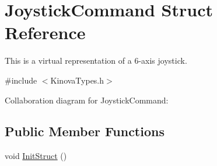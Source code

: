 \hypertarget{struct_joystick_command}{}\section{Joystick\+Command Struct Reference}
\label{struct_joystick_command}


This is a virtual representation of a 6-\/axis joystick.  




{\ttfamily \#include $<$Kinova\+Types.\+h$>$}



Collaboration diagram for Joystick\+Command\+:
\subsection*{Public Member Functions}
\begin{DoxyCompactItemize}
\item 
void \hyperlink{struct_joystick_command_ad3d41f607c6ea6916e061a8edae5a0e4}{Init\+Struct} ()
\end{DoxyCompactItemize}
